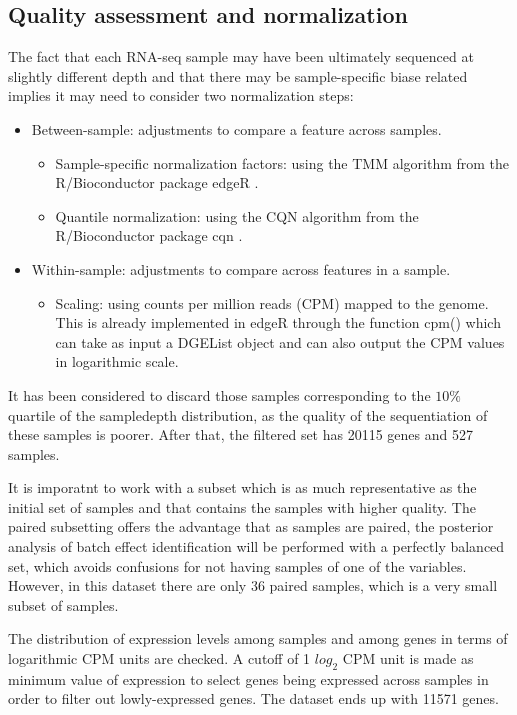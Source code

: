 \documentclass[9pt,twocolumn,twoside]{gsajnl}
\begin{document}
\subsection*{Quality assessment and normalization}
The fact that each RNA-seq sample may have been ultimately sequenced at slightly different depth and that there may be sample-specific biase related implies it may need to consider two normalization steps:
\begin{itemize}
\item Between-sample: adjustments to compare a feature across samples.
\begin{itemize}
\item Sample-specific normalization factors: using the TMM algorithm from the R/Bioconductor package edgeR \citep{Robinson2010b}.
\item Quantile normalization: using the CQN algorithm from the R/Bioconductor package cqn \citep{Hansen2012b}.
\end{itemize}
\item Within-sample: adjustments to compare across features in a sample.
\begin{itemize}
\item Scaling: using counts per million reads (CPM) mapped to the genome. This is already implemented in edgeR \citep{Robinson2010b} through the function cpm() which can take as input a DGEList object and can also output the CPM values in logarithmic scale.
\end{itemize}
\end{itemize}

It has been considered to discard those samples corresponding to the $ 10\% $ quartile of the sampledepth distribution, as the quality of the sequentiation of these samples is poorer. After that, the filtered set has 20115 genes and 527 samples.

It is imporatnt to work with a subset which is as much representative as the initial set of samples and that contains the samples with higher quality. The paired subsetting offers the advantage that as samples are paired, the posterior analysis of batch effect identification will be performed with a perfectly balanced set, which avoids confusions for not having samples of one of the variables. However, in this dataset there are only 36 paired samples, which is a very small subset of samples.

The distribution of expression levels among samples and among genes in terms of logarithmic CPM units are checked. A cutoff of 1 $log_{2}$ CPM unit is made as minimum value of expression to select genes being expressed across samples in order to filter out lowly-expressed genes. The dataset ends up with 11571 genes.
\end{document}
